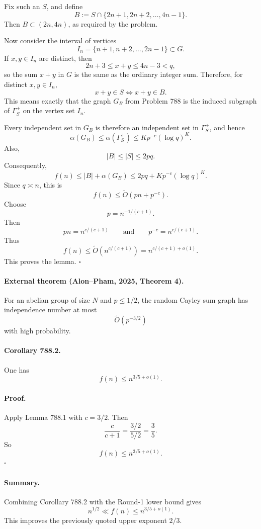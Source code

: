 Fix such an $S$, and define
\[
 B := S \cap \{2n+1,2n+2,\dots,4n-1\}.
\]
Then $B \subset (2n,4n)$, as required by the problem.

Now consider the interval of vertices
\[
 I_n = \{n+1,n+2,\dots,2n-1\} \subset G.
\]
If $x,y \in I_n$ are distinct, then
\[
 2n+3 \le x+y \le 4n-3 < q,
\]
so the sum $x+y$ in $G$ is the same as the ordinary integer sum. Therefore, for distinct $x,y \in I_n$,
\[
 x+y \in S \iff x+y \in B.
\]
This means exactly that the graph $G_B$ from Problem 788 is the induced subgraph of $\Gamma_S^+$ on the vertex set $I_n$.

Every independent set in $G_B$ is therefore an independent set in $\Gamma_S^+$, and hence
\[
 \alpha(G_B) \le \alpha(\Gamma_S^+) \le K p^{-c} (\log q)^K.
\]
Also,
\[
 |B| \le |S| \le 2pq.
\]
Consequently,
\[
 f(n) \le |B| + \alpha(G_B)
 \le 2pq + K p^{-c} (\log q)^K.
\]
Since $q \asymp n$, this is
\[
 f(n) \le \widetilde O(pn + p^{-c}).
\]
Choose
\[
 p = n^{-1/(c+1)}.
\]
Then
\[
 pn = n^{c/(c+1)}
\qquad\text{and}\qquad
p^{-c} = n^{c/(c+1)}.
\]
Thus
\[
 f(n) \le \widetilde O\!\left(n^{c/(c+1)}\right)
 = n^{c/(c+1)+o(1)}.
\]
This proves the lemma.
\hfill$\square$

\paragraph{External theorem (Alon--Pham, 2025, Theorem 4).}
For an abelian group of size $N$ and $p \le 1/2$, the random Cayley sum graph has independence number at most
\[
 \widetilde O(p^{-3/2})
\]
with high probability.

\paragraph{Corollary 788.2.}
One has
\[
 f(n) \le n^{3/5+o(1)}.
\]

\paragraph{Proof.}
Apply Lemma 788.1 with $c=3/2$. Then
\[
 \frac{c}{c+1} = \frac{3/2}{5/2} = \frac35.
\]
So
\[
 f(n) \le n^{3/5+o(1)}.
\]
\hfill$\square$

\paragraph{Summary.}
Combining Corollary 788.2 with the Round-1 lower bound gives
\[
 n^{1/2} \ll f(n) \le n^{3/5+o(1)}.
\]
This improves the previously quoted upper exponent $2/3$.

